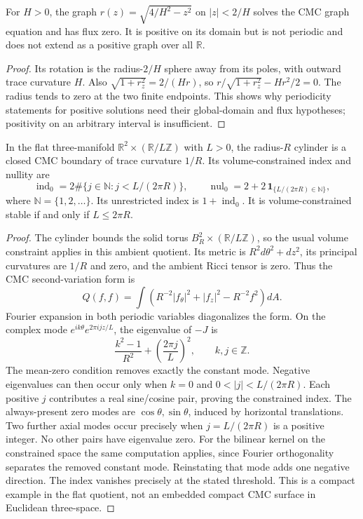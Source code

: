 \begin{example}\label{ex:sphere-zero-flux-graph}
For $H>0$, the graph $r(z)=\sqrt{4/H^2-z^2}$ on $|z|<2/H$ solves the CMC graph equation and has flux zero. It is positive on its domain but is not periodic and does not extend as a positive graph over all $\mathbb R$.
\end{example}
\begin{proof}
Its rotation is the radius-$2/H$ sphere away from its poles, with outward trace curvature $H$. Also $\sqrt{1+r_z^2}=2/(Hr)$, so $r/\sqrt{1+r_z^2}-Hr^2/2=0$. The radius tends to zero at the two finite endpoints. This shows why periodicity statements for positive solutions need their global-domain and flux hypotheses; positivity on an arbitrary interval is insufficient.
\end{proof}

\begin{proposition}\label{prop:periodic-cylinder-cmc-index}
In the flat three-manifold $\mathbb R^2\times(\mathbb R/L\mathbb Z)$ with $L>0$, the radius-$R$ cylinder is a closed CMC boundary of trace curvature $1/R$. Its volume-constrained index and nullity are
\[
 \operatorname{ind}_0=2\#\{j\in\mathbb N:j<L/(2\pi R)\},\qquad
 \operatorname{nul}_0=2+2\,\mathbf1_{\{L/(2\pi R)\in\mathbb N\}},
\]
where $\mathbb N=\{1,2,\ldots\}$. Its unrestricted index is $1+\operatorname{ind}_0$. It is volume-constrained stable if and only if $L\le2\pi R$.
\end{proposition}
\begin{proof}
The cylinder bounds the solid torus $B_R^2\times(\mathbb R/L\mathbb Z)$, so the usual volume constraint applies in this ambient quotient. Its metric is $R^2d\theta^2+dz^2$, its principal curvatures are $1/R$ and zero, and the ambient Ricci tensor is zero. Thus the CMC second-variation form is
\[
 Q(f,f)=\int\left(R^{-2}|f_\theta|^2+|f_z|^2-R^{-2}f^2\right)dA.
\]
Fourier expansion in both periodic variables diagonalizes the form. On the complex mode $e^{ik\theta}e^{2\pi ijz/L}$, the eigenvalue of $-J$ is
\[
 \frac{k^2-1}{R^2}+\left(\frac{2\pi j}L\right)^2,\qquad k,j\in\mathbb Z.
\]
The mean-zero condition removes exactly the constant mode. Negative eigenvalues can then occur only when $k=0$ and $0<|j|<L/(2\pi R)$. Each positive $j$ contributes a real sine/cosine pair, proving the constrained index. The always-present zero modes are $\cos\theta,\sin\theta$, induced by horizontal translations. Two further axial modes occur precisely when $j=L/(2\pi R)$ is a positive integer. No other pairs have eigenvalue zero. For the bilinear kernel on the constrained space the same computation applies, since Fourier orthogonality separates the removed constant mode. Reinstating that mode adds one negative direction. The index vanishes precisely at the stated threshold. This is a compact example in the flat quotient, not an embedded compact CMC surface in Euclidean three-space.
\end{proof}

